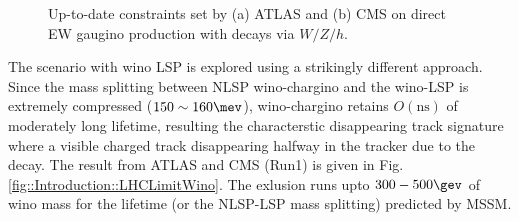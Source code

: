 \begin{figure}[h]
  \centering
    \caption{Up-to-date constraints set by (a) ATLAS and (b) CMS on direct EW gaugino production with decays via $W/Z/h$.}
    \label{fig::Introduction::LHCLimitEWKino}
\end{figure}


The scenario with wino LSP is explored using a strikingly different approach. Since the mass splitting between NLSP wino-chargino and the wino-LSP is extremely compressed ($150 \sim 160\mev$), wino-chargino retains $O(\mathrm{ns})$ of moderately long lifetime, resulting the characterstic disappearing track signature where a visible charged track disappearing halfway in the tracker due to the decay. The result from ATLAS and CMS (Run1) is given in Fig. \ref{fig::Introduction::LHCLimitWino}.
The exlusion runs upto $300-500\gev$ of wino mass for the lifetime (or the NLSP-LSP mass splitting) predicted by MSSM. \\

